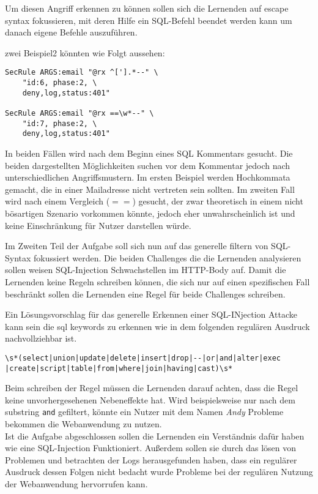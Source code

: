 Um diesen Angriff erkennen zu können sollen sich die Lernenden auf escape syntax fokussieren, mit deren Hilfe ein SQL-Befehl beendet werden kann um danach eigene Befehle auszuführen.

zwei Beispiel2 könnten wie Folgt aussehen:

\begin{verbatim}
SecRule ARGS:email "@rx ^['].*--" \ 
    "id:6, phase:2, \
    deny,log,status:401"

SecRule ARGS:email "@rx ==\w*--" \
    "id:7, phase:2, \
    deny,log,status:401"
\end{verbatim}

In beiden Fällen wird nach dem Beginn eines SQL Kommentars gesucht.
Die beiden dargestellten Möglichkeiten suchen vor dem Kommentar jedoch nach unterschiedlichen Angriffsmustern.
Im ersten Beispiel werden Hochkommata gemacht, die in einer Mailadresse nicht vertreten sein sollten.
Im zweiten Fall wird nach einem Vergleich ($==$) gesucht, der zwar theoretisch in einem nicht bösartigen Szenario vorkommen könnte, jedoch eher unwahrscheinlich ist und keine Einschränkung für Nutzer darstellen würde.

Im Zweiten Teil der Aufgabe soll sich nun auf das generelle filtern von SQL-Syntax fokussiert werden.
Die beiden Challenges die die Lernenden analysieren sollen weisen SQL-Injection Schwachstellen im HTTP-Body auf.
Damit die Lernenden keine Regeln schreiben können, die sich nur auf einen spezifischen Fall beschränkt sollen die Lernenden eine Regel für beide Challenges schreiben.

Ein Lösungsvorschlag für das generelle Erkennen einer SQL-INjection Attacke kann sein die sql keywords zu erkennen wie in dem folgenden regulären Ausdruck nachvollziehbar ist.

\begin{verbatim}
\s*(select|union|update|delete|insert|drop|--|or|and|alter|exec
|create|script|table|from|where|join|having|cast)\s*
\end{verbatim}

Beim schreiben der Regel müssen die Lernenden darauf achten, dass die Regel keine unvorhergesehenen Nebeneffekte hat.
Wird beispielsweise nur nach dem substring \verb|and| gefiltert, könnte ein Nutzer mit dem Namen \textit{Andy} Probleme bekommen die Webanwendung zu nutzen.\\


Ist die Aufgabe abgeschlossen sollen die Lernenden ein Verständnis dafür haben wie eine SQL-Injection Funktioniert.
Außerdem sollen sie durch das lösen von Problemen und betrachten der Logs herausgefunden haben, dass ein regulärer Ausdruck dessen Folgen nicht bedacht wurde Probleme bei der regulären Nutzung der Webanwendung hervorrufen kann.

